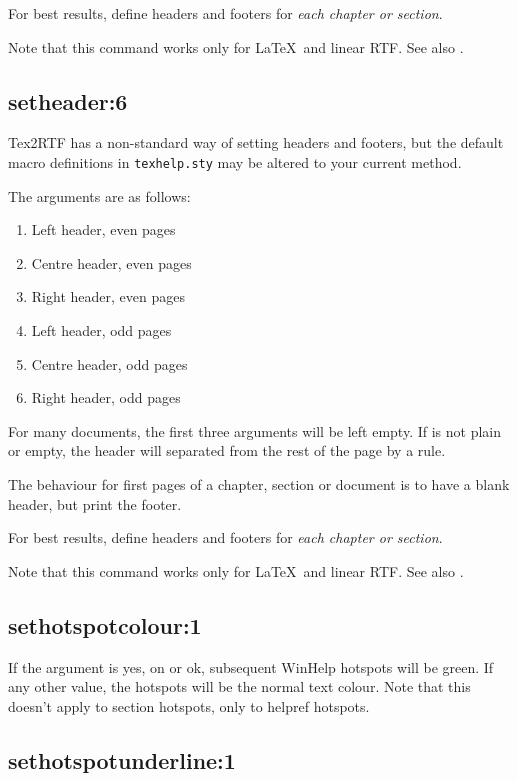 For best results, define headers and footers for {\it each chapter or
section}.

Note that this command works only for \LaTeX\ and linear RTF. See also\rtfsp
{}.

\subsection*{setheader:6}\label{setheader}

Tex2RTF has a non-standard way of setting headers and footers,
but the default macro definitions in {\tt texhelp.sty} may be altered
to your current method.

The arguments are as follows:

\begin{enumerate}
\itemsep=0pt
\item Left header, even pages
\item Centre header, even pages
\item Right header, even pages
\item Left header, odd pages
\item Centre header, odd pages
\item Right header, odd pages
\end{enumerate}

For many documents, the first three arguments will be left empty.
If  is not plain or empty, the
header will separated from the rest of the page by a rule.

The behaviour for first pages of a chapter, section or document
is to have a blank header, but print the footer.

For best results, define headers and footers for {\it each chapter or
section}.

Note that this command works only for \LaTeX\ and linear RTF. See also\rtfsp
{}.

\subsection*{sethotspotcolour:1}\label{sethotspotcolour}

If the argument is yes, on or ok, subsequent WinHelp hotspots will be green.
If any other value, the hotspots will be the normal text colour. Note that this
doesn't apply to section hotspots, only to helpref hotspots.

\subsection*{sethotspotunderline:1}\label{sethotspotunderline}

